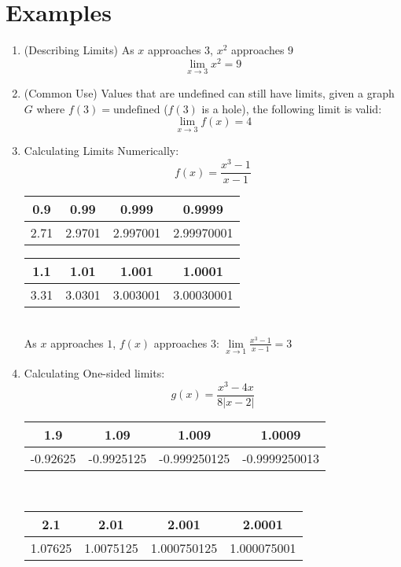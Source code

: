 \documentclass{article}
\begin{document}
\section*{Examples}
\begin{enumerate}
    \item (Describing Limits) As $x$ approaches $3$, $x^2$ approaches $9$
    $$\lim_{x \to 3}{x^2 = 9}$$
    \item (Common Use) Values that are undefined can still have limits, given a graph $G$ where $f(3) = \text{undefined}$ ($f(3)$ is a hole), the following limit is valid:
    $$\lim_{x \to 3}{f(x) = 4}$$
    \item Calculating Limits Numerically:
	$$f(x) = \frac{x^3-1}{x-1}$$
	\begin{tabular}{| c | c | c | c |}
        \hline
	    0.9 & 0.99 & 0.999 & 0.9999 \\
        \hline
	    2.71 & 2.9701 & 2.997001 & 2.99970001 \\
        \hline
    \end{tabular}
	  

	\begin{tabular}{| c | c | c | c |}
        \hline
	    1.1 & 1.01 & 1.001 & 1.0001 \\
        \hline
	    3.31 & 3.0301 & 3.003001 & 3.00030001 \\
        \hline
    \end{tabular} \\
	As $x$ approaches $1$, $f(x)$ approaches $3$: $\lim\limits_{x \to 1}{\frac{x^3-1}{x-1}} = 3$

    \item Calculating One-sided limits:
	$$g(x) = \frac{x^3 - 4x}{8|x-2|}$$
	  
	\begin{tabular}{| c | c | c | c |}
        \hline
	    1.9 & 1.09 & 1.009 & 1.0009 \\
        \hline
	    -0.92625 & -0.9925125 & -0.999250125 & -0.9999250013 \\
        \hline
    \end{tabular} \\
	  
	\begin{tabular}{| c | c | c | c |}
        \hline
	    2.1 & 2.01 & 2.001 & 2.0001 \\
        \hline
	    1.07625 & 1.0075125 & 1.000750125 & 1.000075001 \\
        \hline
    \end{tabular} \\
	  

\end{enumerate}
\end{document}
